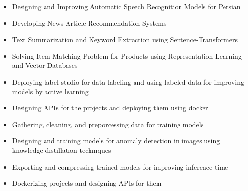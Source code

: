 \documentclass[10pt,a4paper]{altacv}
\begin{document}
\begin{paracol}{2}




	\begin{itemize}
		\justifying
		\item \small{Designing and Improving Automatic Speech Recognition Models for Persian}
		\item\small{Developing News Article Recommendation Systems}
		\item\small{Text Summarization and Keyword Extraction using Sentence-Transformers}
		\item\small{Solving Item Matching Problem for Products using Representation Learning and Vector Databases}
		\item\small{Deploying label studio for data labeling and using labeled data for improving models by active learning}
		\item\small{Designing APIs for the projects and deploying them using docker}
	\end{itemize}
\divider

\begin{itemize}
	\justifying
\item \small{Gathering, cleaning, and preporcessing data for  training models}
\item\small{Designing and training models for anomaly detection in images using knowledge distillation techniques}
\item\small{Exporting and compressing trained models for improving inference time}
\item\small{Dockerizing projects and designing APIs for them}
\end{itemize}


\end{paracol}
\end{document}
